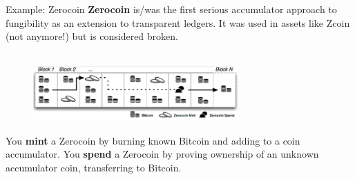 \documentclass[aspectratio=169]{beamer}
\begin{document}
\begin{frame}{Example: Zerocoin}
\textbf{Zerocoin} is/was the first serious accumulator approach to fungibility as an extension to transparent ledgers. It was used in assets like Zcoin (not anymore!) but is considered broken. \\~\\

\begin{figure}
\includegraphics[width=0.7\textwidth]{zerocoin-chain.png}
\end{figure}

You \textbf{mint} a Zerocoin by burning known Bitcoin and adding to a coin accumulator. You \textbf{spend} a Zerocoin by proving ownership of an unknown accumulator coin, transferring to Bitcoin.
\end{frame}
\end{document}
